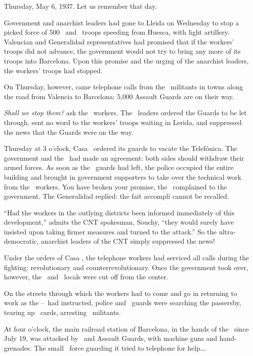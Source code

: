\smallskip
 
Thursday, May 6, 1937. Let us remember that day.

\smallskip

Government and anarchist leaders had gone to Lleida on Wednesday to stop a picked force of 500 \POUM\ and \CNT\ troops speeding from Huesca, with light artillery. Valencian and Generalidad representatives had promised that if the workers’ troops did not advance, the government would not try to bring any more of its troops into Barcelona. Upon this promise and the urging of the anarchist leaders, the workers’ troops had stopped.

On Thursday, however, came telephone calls from the \CNT\ militants in towns along the road from Valencia to Barcelona: 5,000 Assault Guards are on their way.

\emph{Shall we stop them?} ask the \CNT\ workers. The \CNT\ leaders ordered the Guards to be let through, sent no word to the workers’ troops waiting in Lerida, and suppressed the news that the Guards were on the way.

Thursday at 3 o’clock, Casa \CNT\ ordered its guards to vacate the Telef\'onica. The government and the \CNT\ had made an agreement: both sides should withdraw their armed forces. As soon as the \CNT\ guards had left, the police occupied the entire building and brought in government supporters to take over the technical work from the \CNT\ workers. You have broken your promise, the \CNT\ complained to the government. The Generalidad replied: the fait accompli cannot be recalled.

``Had the workers in the outlying districts been informed immediately of this development,'' admits the CNT spokesman, Souchy, ``they would surely have insisted upon taking firmer measures and turned to the attack.'' So the ultra-democratic, anarchist leaders of the CNT simply suppressed the news!

Under the orders of Casa \CNT\kn, the telephone workers had serviced all calls during the fighting: revolutionary and counterrevolutionary. Once the government took over, however, the \FAI\ and \CNT\ locals were cut off from the center.

On the streets through which the workers had to come and go in returning to work as the \CNT--\UGT\ had instructed, police and \PSUC\ guards were searching the passersby, tearing up \CNT\ cards, arresting \CNT\ militants.

At four o’clock, the main railroad station of Barcelona, in the hands of the \CNT\ since July 19, was attacked by \PSUC\ and Assault Guards, with machine guns and hand-grenades. The small \CNT\ force guarding it tried to telephone for help\dots.

